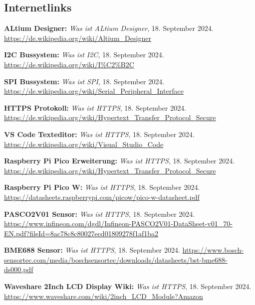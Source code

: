 \begin{literature}

\section*{Internetlinks}





\textbf{ALtium Designer:} \textit{Was ist ALtium Designer}, 18. September 2024. \url{https://de.wikipedia.org/wiki/Altium_Designer}

\textbf{I2C Bussystem:} \textit{Was ist I2C}, 18. September 2024. \url{https://de.wikipedia.org/wiki/I%C2%B2C}

\textbf{SPI Bussystem:} \textit{Was ist SPI}, 18. September 2024. \url{https://de.wikipedia.org/wiki/Serial_Peripheral_Interface}

\textbf{HTTPS Protokoll:} \textit{Was ist HTTPS}, 18. September 2024. \url{https://de.wikipedia.org/wiki/Hypertext_Transfer_Protocol_Secure}

\textbf{VS Code Texteditor:} \textit{Was ist HTTPS}, 18. September 2024. \url{https://de.wikipedia.org/wiki/Visual_Studio_Code}

\textbf{Raspberry Pi Pico Erweiterung:} \textit{Was ist HTTPS}, 18. September 2024. \url{https://de.wikipedia.org/wiki/Hypertext_Transfer_Protocol_Secure}

\textbf{Raspberry Pi Pico W:} \textit{Was ist HTTPS}, 18. September 2024. \url{https://datasheets.raspberrypi.com/picow/pico-w-datasheet.pdf}

\textbf{PASCO2V01 Sensor:} \textit{Was ist HTTPS}, 18. September 2024. \url{https://www.infineon.com/dgdl/Infineon-PASCO2V01-DataSheet-v01_70-EN.pdf?fileId=8ac78c8c80027ecd01809278f1af1ba2}

\textbf{BME688 Sensor:} \textit{Was ist HTTPS}, 18. September 2024. 
\url{https://www.bosch-sensortec.com/media/boschsensortec/downloads/datasheets/bst-bme688-ds000.pdf}

\textbf{Waveshare 2Inch LCD Display Wiki:} \textit{Was ist HTTPS}, 18. September 2024. \url{https://www.waveshare.com/wiki/2inch_LCD_Module?Amazon}


\end{literature}
